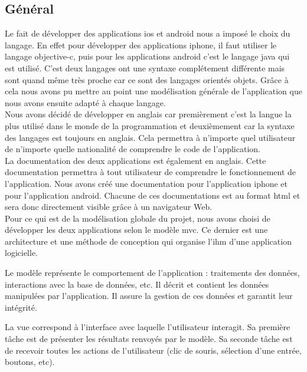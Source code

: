 \subsection{Général}
	Le fait de développer des applications \gls{ios} et \gls{android} nous a imposé le choix du langage. En effet pour développer des applications \gls{iphone}, il faut utiliser le langage \gls{objective-c}, puis  pour les applications \gls{android} c'est le langage \gls{java} qui est utilisé. C'est deux langages ont une syntaxe complétement différente mais sont quand même très proche car ce sont des langages orientés objets. Grâce à cela nous avons pu mettre au point une modélisation générale de l'application que nous avons ensuite adapté à chaque langage.\\
			
	Nous avons décidé de développer en anglais car premièrement c'est la langue la plus utilisé dans le monde de la programmation et deuxièmement car la syntaxe des langages est toujours en anglais. Cela permettra à n'importe quel utilisateur de n'importe quelle nationalité de comprendre le code de l'application.\\
			
	La documentation des deux applications est également en anglais. Cette documentation permettra à tout utilisateur de comprendre le fonctionnement de l'application.
	Nous avons créé une documentation pour l'application \gls{iphone} et pour l'application \gls{android}. Chacune de ces documentations est au format \gls{html} et sera donc directement visible grâce à un navigateur Web.\\
			
	Pour ce qui est de la modélisation globale du projet, nous avons choisi de développer les deux applications selon le modèle \gls{mvc}. Ce dernier est une architecture et une méthode de conception qui organise l'\gls{ihm} d'une application logicielle. 
			
	Le modèle représente le comportement de l'application : traitements des données, interactions avec la base de données, etc. Il décrit et contient les données manipulées par l'application. Il assure la gestion de ces données et garantit leur intégrité.
			
	La vue correspond à l'interface avec laquelle l'utilisateur interagit. Sa première tâche est de présenter les résultats renvoyés par le modèle. Sa seconde tâche est de recevoir toutes les actions de l'utilisateur (clic de souris, sélection d'une entrée, boutons, etc).
			
